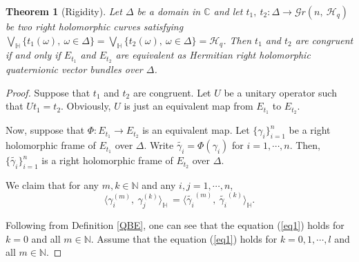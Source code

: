 \documentclass[pdflatex,sn-mathphys-num]{sn-jnl}%
\theoremstyle{thmstyleone}%
\newtheorem{theorem}{Theorem}%
\theoremstyle{thmstyletwo}%
\theoremstyle{thmstylethree}%
\newtheorem{theorem}{Theorem}[section]
\theoremstyle{definition}
\theoremstyle{remark}
\begin{document}
\begin{theorem}[Rigidity]\label{RT}
	Let $\Delta$ be a domain in $\mathbb{C}$ and let $t_1,\ t_2:\Delta\rightarrow\mathcal{G}r(n,\ \mathcal{H}_q)$ be two right holomorphic curves satisfying $\bigvee\limits_{\mathbb{H}}\{ t_1(\omega),\ \omega\in\Delta\}=\bigvee\limits_{\mathbb{H}}\{ t_2(\omega),\ \omega\in\Delta\}=\mathcal{H}_q$.
    Then $t_1$ and $t_2$ are congruent if and only if $E_{t_1}$ and $E_{t_2}$ are equivalent as Hermitian right holomorphic quaternionic vector bundles over $\Delta$.
\end{theorem}
	\begin{proof}
	Suppose that $t_1$ and $t_2$ are congruent. Let $U$ be a unitary operator such that $Ut_1=t_2$. Obviously, $U$ is just an equivalent map from $E_{t_1}$ to $E_{t_2}$.
	
	Now, suppose that $\Phi:E_{t_1}\rightarrow E_{t_2}$ is an equivalent map. Let $\{\gamma_i\}_{i=1}^{n}$ be a right holomorphic frame of $E_{t_1}$ over $\Delta$. Write $\widetilde{\gamma_i}=\Phi(\gamma_i)$ for $i=1,\cdots,n$. Then, $\{\widetilde{\gamma_i}\}_{i=1}^{n}$ is a right holomorphic frame of $E_{t_2}$ over $\Delta$.

   We claim that for any $m,k\in\mathbb{N}$ and any $i,j=1,\cdots,n$,
\begin{equation}\label{eq1}
	\langle\gamma_i^{(m)},\ \gamma_j^{(k)}\rangle_{\mathbb{H}}\ =\langle\widetilde{\gamma_i}^{(m)},\ \widetilde{\gamma_i}^{(k)}\rangle_{\mathbb{H}}.
\end{equation}

Following from Definition \ref{QBE}, one can see that the equation (\ref{eq1}) holds for $k=0$ and all $m\in\mathbb{N}$. Assume that the equation (\ref{eq1}) holds for $k=0,1,\cdots, l$ and all $m\in\mathbb{N}$.


\end{proof}
\end{document}
